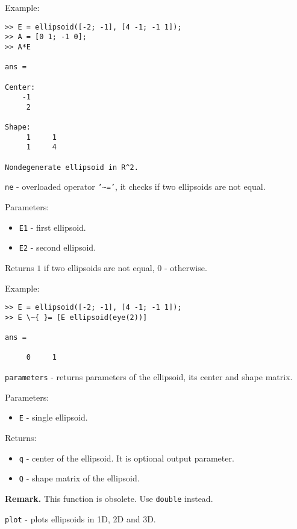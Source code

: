 Example:
{\tt \begin{verbatim}
>> E = ellipsoid([-2; -1], [4 -1; -1 1]);
>> A = [0 1; -1 0];
>> A*E

ans =

Center:
    -1
     2

Shape:
     1     1
     1     4

Nondegenerate ellipsoid in R^2.
\end{verbatim} }

\newpage

{\Large {\tt ne}} - overloaded operator {\tt '\~{ }='},
it checks if two ellipsoids are not equal.

Parameters:
\begin{itemize}
\item {\tt E1} - first ellipsoid.
\item {\tt E2} - second ellipsoid.
\end{itemize}

Returns $1$ if two ellipsoids are not equal, $0$ - otherwise.

Example:
{\tt \begin{verbatim}
>> E = ellipsoid([-2; -1], [4 -1; -1 1]);
>> E \~{ }= [E ellipsoid(eye(2))]

ans =

     0     1
\end{verbatim} }

\newpage

{\Large {\tt parameters}} - returns parameters of the ellipsoid, its center
and shape matrix.

Parameters:
\begin{itemize}
\item {\tt E} - single ellipsoid.
\end{itemize}

Returns:
\begin{itemize}
\item {\tt q} - center of the ellipsoid. It is optional output parameter.
\item {\tt Q} - shape matrix of the ellipsoid.
\end{itemize}

{\bf Remark.} This function is obsolete. Use {\tt double} instead.

\newpage

{\Large {\tt plot}} - plots ellipsoids in 1D, 2D and 3D.

